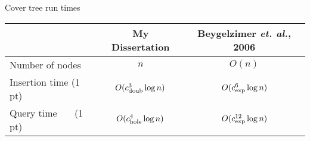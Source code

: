
\begin{frame}[fragile]{Cover tree run times}


\begingroup
\begin{center}
\renewcommand*{\arraystretch}{1.9}
\begin{tabular}{l|c|c|}
& \footnotesize My Dissertation
& \footnotesize Beygelzimer \emph{et. al.}, 2006
\\
\hline
Number of nodes       & $n$                   & $O(n)$                \\
Insertion time (1 pt) & $O(c_\textnormal{doub}^3 \log n)$   & $O(c_\textnormal{exp}^6 \log n)$   \\
Query time ~~~(1 pt)  & $O(c_\textnormal{hole}^4\log n)$    & $O(c_\textnormal{exp}^{12}\log n)$ \\
\hline
\end{tabular}
\end{center}
\endgroup


\end{frame}
